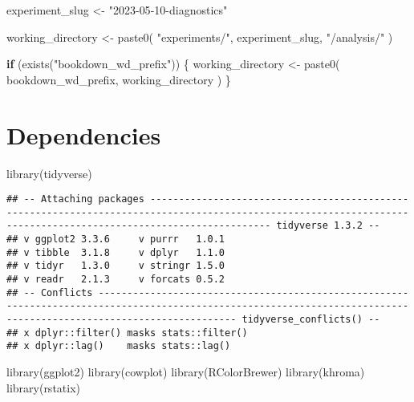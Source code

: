\documentclass[
]{book}
\newenvironment{Shaded}{\begin{snugshade}}{\end{snugshade}}
\newcommand{\ControlFlowTok}[1]{\textcolor[rgb]{0.13,0.29,0.53}{\textbf{#1}}}
\newcommand{\FunctionTok}[1]{\textcolor[rgb]{0.00,0.00,0.00}{#1}}
\newcommand{\NormalTok}[1]{#1}
\newcommand{\OtherTok}[1]{\textcolor[rgb]{0.56,0.35,0.01}{#1}}
\newcommand{\StringTok}[1]{\textcolor[rgb]{0.31,0.60,0.02}{#1}}
\begin{document}
\begin{Shaded}
\begin{Highlighting}[]
\NormalTok{experiment\_slug }\OtherTok{\textless{}{-}} \StringTok{"2023{-}05{-}10{-}diagnostics"}

\NormalTok{working\_directory }\OtherTok{\textless{}{-}} \FunctionTok{paste0}\NormalTok{(}
  \StringTok{"experiments/"}\NormalTok{,}
\NormalTok{  experiment\_slug,}
  \StringTok{"/analysis/"}
\NormalTok{)}

\ControlFlowTok{if}\NormalTok{ (}\FunctionTok{exists}\NormalTok{(}\StringTok{"bookdown\_wd\_prefix"}\NormalTok{)) \{}
\NormalTok{  working\_directory }\OtherTok{\textless{}{-}} \FunctionTok{paste0}\NormalTok{(}
\NormalTok{    bookdown\_wd\_prefix,}
\NormalTok{    working\_directory}
\NormalTok{  )}
\NormalTok{\}}
\end{Highlighting}
\end{Shaded}

\hypertarget{dependencies}{%
\section{Dependencies}\label{dependencies}}

\begin{Shaded}
\begin{Highlighting}[]
\FunctionTok{library}\NormalTok{(tidyverse)}
\end{Highlighting}
\end{Shaded}

\begin{verbatim}
## -- Attaching packages ----------------------------------------------------------------------------------------------------------------------------------------------------------------- tidyverse 1.3.2 --
## v ggplot2 3.3.6     v purrr   1.0.1
## v tibble  3.1.8     v dplyr   1.1.0
## v tidyr   1.3.0     v stringr 1.5.0
## v readr   2.1.3     v forcats 0.5.2
## -- Conflicts -------------------------------------------------------------------------------------------------------------------------------------------------------------------- tidyverse_conflicts() --
## x dplyr::filter() masks stats::filter()
## x dplyr::lag()    masks stats::lag()
\end{verbatim}

\begin{Shaded}
\begin{Highlighting}[]
\FunctionTok{library}\NormalTok{(ggplot2)}
\FunctionTok{library}\NormalTok{(cowplot)}
\FunctionTok{library}\NormalTok{(RColorBrewer)}
\FunctionTok{library}\NormalTok{(khroma)}
\FunctionTok{library}\NormalTok{(rstatix)}
\end{Highlighting}
\end{Shaded}
\end{document}
